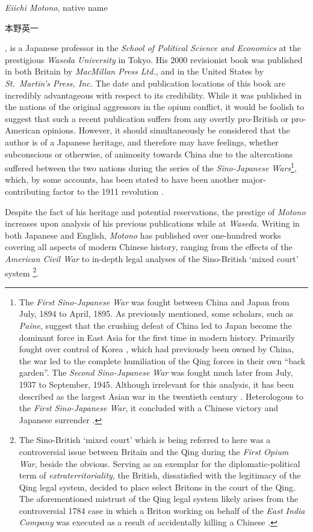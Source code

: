 \documentclass[a4paper,oneside]{article}
\newcommand{\jap}[1]{%
        \begin{CJK*}{UTF8}{min}%
                \normalfont%
                #1
        \end{CJK*}
}
\begin{document}
\textit{Eiichi Motono}, native name \jap{本野英一}, is a Japanese professor in
the \textit{School of Political Science and Economics} at the prestigious
\textit{Waseda University} in Tokyo. His 2000 revisionist book was published in
both Britain by \textit{MacMillan Press Ltd.}, and in the United States by
\textit{St.\ Martin's Press, Inc.} The date and publication locations of this
book are incredibly advantageous with respect to its credibility. While it was
published in the nations of the original aggressors in the opium conflict, it
would be foolish to suggest that such a recent publication suffers from any
overtly pro-British or pro-American opinions. However, it should simultaneously
be considered that the author is of a Japanese heritage, and therefore may have
feelings, whether subconscious or otherwise, of animosity towards China due to
the altercations suffered between the two nations during the series of the
\textit{Sino-Japanese Wars}\footnote{The \textit{First Sino-Japanese War} was
fought between China and Japan from  July, 1894 to  April, 1895.
As previously mentioned, some scholars, such as \textit{Paine}, suggest that the
crushing defeat of China led to Japan become the dominant force in East Asia for
the first time in modern history. Primarily fought over control of Korea
\autocite{Olender:2014}, which had previously been owned by China, the war led
to the complete humiliation of the Qing forces in their own ``back garden''. The
\textit{Second Sino-Japanese War} was fought much later from  July, 1937
to  September, 1945. Although irrelevant for this analysis, it has been
described as the largest Asian war in the twentieth century \autocite{Bix:1992}.
Heterologous to the \textit{First Sino-Japanese War}, it concluded with a
Chinese victory and Japanese surrender \autocite{Kitamura:2014}.}, which, by
some accounts, has been stated to have been another major-contributing factor to
the 1911 revolution \autocite{Paine:2009}.

Despite the fact of his heritage and potential reservations, the prestige of
\textit{Motono} increases upon analysis of his previous publications while at
\textit{Waseda}. Writing in both Japanese and English, \textit{Motono} has
published over one-hundred works covering all aspects of modern Chinese history,
ranging from the effects of the \textit{American Civil War}
\autocite{Motono:1984} to in-depth legal analyses of the Sino-British `mixed
court' system \autocite{Motono:1996}\footnote{The Sino-British `mixed court'
which is being referred to here was a controversial issue between Britain and
the Qing during the \textit{First Opium War}, beside the obvious. Serving as an
exemplar for the diplomatic-political term of \textit{extraterritoriality}, the
British, dissatisfied with the legitimacy of the Qing legal system, decided to
place select Britons in the court of the Qing. The aforementioned mistrust of
the Qing legal system likely arises from the controversial 1784 case in which a
Briton working on behalf of the \textit{East India Company} was executed as a
result of accidentally killing a Chinese \autocite{Cassel:2012}.}.
\end{document}
